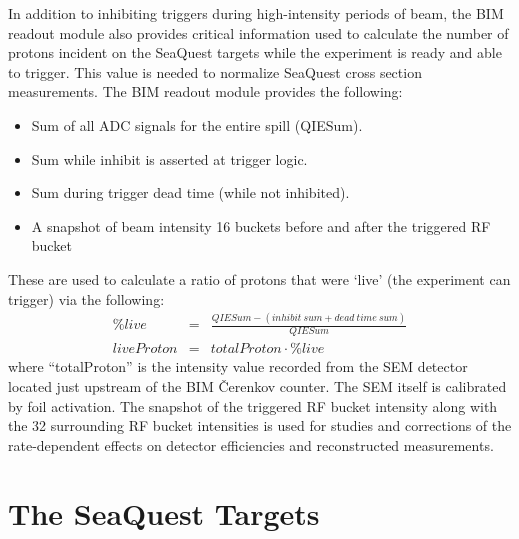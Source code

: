 In addition to inhibiting triggers during high-intensity periods of beam, the BIM readout module also provides critical information used to calculate the number of protons incident on the SeaQuest targets while the experiment is ready and able to trigger. This value is needed to normalize SeaQuest cross section measurements. The BIM readout module provides the following:
\begin{itemize}
	\item Sum of all ADC signals for the entire spill (QIESum).
	\item Sum while inhibit is asserted at trigger logic.
	\item Sum during trigger dead time (while not inhibited).
	\item A snapshot of beam intensity 16 buckets before and after the triggered RF bucket
\end{itemize}

These are used to calculate a ratio of protons that were `live' (the experiment can trigger) via the following:
\begin{eqnarray}
\%live & = & \frac{QIESum - (inhibit\ sum + dead\ time\ sum)}{QIESum} \\
liveProton & = & totalProton \cdot \%live
\label{eqn:liveproton}
\end{eqnarray}
where ``totalProton'' is the intensity value recorded from the SEM detector located just upstream of the BIM \v{C}erenkov counter. The SEM itself is calibrated by foil activation. The snapshot of the triggered RF bucket intensity along with the 32 surrounding RF bucket intensities is used for studies and corrections of the rate-dependent effects on detector efficiencies and reconstructed measurements.

\section{The SeaQuest Targets}

